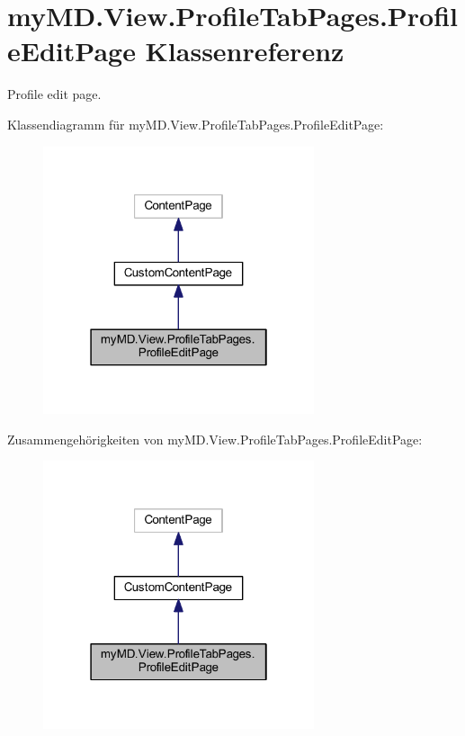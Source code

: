\hypertarget{classmy_m_d_1_1_view_1_1_profile_tab_pages_1_1_profile_edit_page}{}\section{my\+M\+D.\+View.\+Profile\+Tab\+Pages.\+Profile\+Edit\+Page Klassenreferenz}
\label{classmy_m_d_1_1_view_1_1_profile_tab_pages_1_1_profile_edit_page}


Profile edit page.  




Klassendiagramm für my\+M\+D.\+View.\+Profile\+Tab\+Pages.\+Profile\+Edit\+Page\+:\nopagebreak
\begin{figure}[H]
\begin{center}
\leavevmode
\includegraphics[width=226pt]{classmy_m_d_1_1_view_1_1_profile_tab_pages_1_1_profile_edit_page__inherit__graph}
\end{center}
\end{figure}


Zusammengehörigkeiten von my\+M\+D.\+View.\+Profile\+Tab\+Pages.\+Profile\+Edit\+Page\+:\nopagebreak
\begin{figure}[H]
\begin{center}
\leavevmode
\includegraphics[width=226pt]{classmy_m_d_1_1_view_1_1_profile_tab_pages_1_1_profile_edit_page__coll__graph}
\end{center}
\end{figure}
